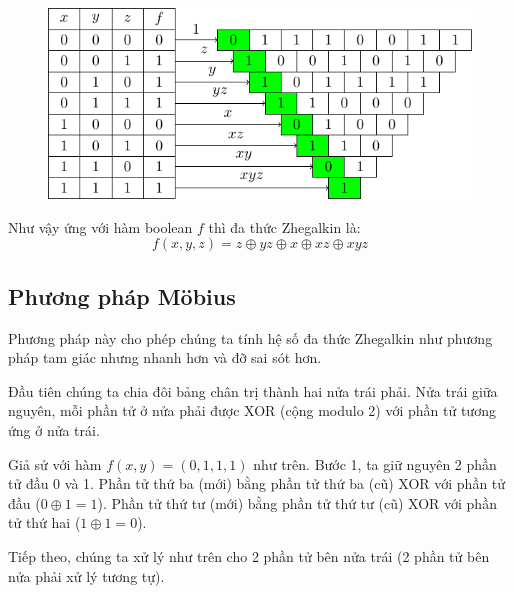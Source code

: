 \begin{figure}[ht]
    \centering
    \includegraphics{../pics/boolean/zhegalkin2.pdf}
\end{figure}

Như vậy ứng với hàm boolean $f$ thì đa thức Zhegalkin là:
\begin{equation*}
    f(x, y, z) = z \oplus yz \oplus x \oplus xz \oplus xyz
\end{equation*}

\subsection{Phương pháp \foreignlanguage{german}{Möbius}}

Phương pháp này cho phép chúng ta tính hệ số đa thức Zhegalkin
như phương pháp tam giác nhưng nhanh hơn và đỡ sai sót hơn.

Đầu tiên chúng ta chia đôi bảng chân trị thành hai nửa trái phải.
Nửa trái giữa nguyên, mỗi phần tử ở nửa phải được XOR (cộng modulo 2)
với phần tử tương ứng ở nửa trái.

Giả sử với hàm $f(x, y) = (0, 1, 1, 1)$ như trên. Bước 1, ta giữ
nguyên 2 phần tử đầu 0 và 1. Phần tử thứ ba (mới) bằng
phần tử thứ ba (cũ) XOR với phần tử đầu ($0 \oplus 1 = 1$).
Phần tử thứ tư (mới) bằng phần tử thứ tư (cũ) XOR với phần tử
thứ hai ($1 \oplus 1 = 0$).

Tiếp theo, chúng ta xử lý như trên cho 2 phần tử bên nửa trái 
(2 phần tử bên nửa phải xử lý tương tự).

